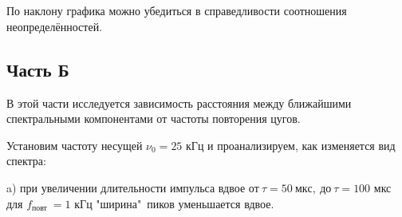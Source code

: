 \\

\

По наклону графика можно убедиться в справедливости соотношения неопределённостей.



\subsection{Часть Б}

В этой части исследуется зависимость расстояния между ближайшими спектральными компонентами от частоты повторения цугов.

Установим частоту несущей $\nu_{0}=25$ кГц и проанализируем, как изменяется вид спектра: 


a) при увеличении длительности импульса вдвое $от \ \tau=50\ мкс, \ до\ \tau=100$ мкс для $f_{\text {повт }}=1$ кГц "ширина"\ пиков уменьшается вдвое. \\

